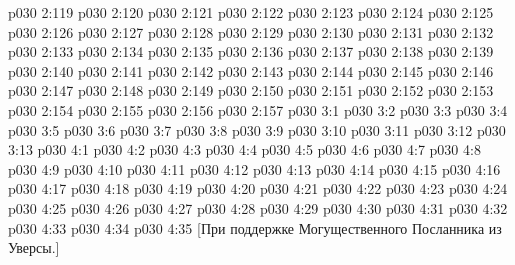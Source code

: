 \vs p030 2:119 
\vs p030 2:120 
\vs p030 2:121 
\vs p030 2:122 
\vs p030 2:123 
\vs p030 2:124 
\vs p030 2:125 
\vs p030 2:126 
\vs p030 2:127 
\vs p030 2:128 
\vs p030 2:129 \pc 
\vs p030 2:130 \pc 
\vs p030 2:131 
\vs p030 2:132 
\vs p030 2:133 
\vs p030 2:134 
\vs p030 2:135 
\vs p030 2:136 
\vs p030 2:137 
\vs p030 2:138 
\vs p030 2:139 \pc 
\vs p030 2:140 
\vs p030 2:141 
\vs p030 2:142 
\vs p030 2:143 
\vs p030 2:144 
\vs p030 2:145 
\vs p030 2:146 
\vs p030 2:147 
\vs p030 2:148 \pc 
\vs p030 2:149 
\vs p030 2:150 
\vs p030 2:151 
\vs p030 2:152 
\vs p030 2:153 
\vs p030 2:154 
\vs p030 2:155 
\vs p030 2:156 
\vs p030 2:157 \pc 
{}
\vs p030 3:1 
\vs p030 3:2 
\vs p030 3:3 
\vs p030 3:4 
\vs p030 3:5 
\vs p030 3:6 
\vs p030 3:7 
\vs p030 3:8 
\vs p030 3:9 
\vs p030 3:10 
\vs p030 3:11 
\vs p030 3:12 
\vs p030 3:13 
\vs p030 4:1 
\vs p030 4:2 
\vs p030 4:3 
\vs p030 4:4 
\vs p030 4:5 
\vs p030 4:6 
\vs p030 4:7 
\vs p030 4:8 
\vs p030 4:9 \pc 
\vs p030 4:10 
\vs p030 4:11 
\vs p030 4:12 
\vs p030 4:13 
\vs p030 4:14 
\vs p030 4:15 
\vs p030 4:16 \pc 
\vs p030 4:17 
\vs p030 4:18 
\vs p030 4:19 
\vs p030 4:20 
\vs p030 4:21 
\vs p030 4:22 
\vs p030 4:23 
\vs p030 4:24 
\vs p030 4:25 
\vs p030 4:26 
\vs p030 4:27 
\vs p030 4:28 
\vs p030 4:29 
\vs p030 4:30 
\vs p030 4:31 
\vs p030 4:32 
\vs p030 4:33 
\vs p030 4:34 \pc 
\vsetoff
\vs p030 4:35 [При поддержке Могущественного Посланника из Уверсы.]
\quizlink
